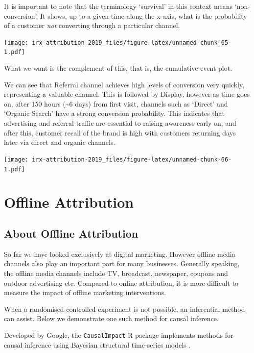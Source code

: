 \documentclass[]{book}
\begin{document}
It is important to note that the terminology `survival' in this context means
`non-conversion'. It shows, up to a given time along the x-axis, what is the probability
of a customer \emph{not} converting through a particular channel.

\texttt{[image: irx-attribution-2019\_files/figure-latex/unnamed-chunk-65-1.pdf]}

What we want is the complement of this, that is, the cumulative event plot.

We can see that Referral channel achieves high levels of conversion very
quickly, representing a valuable channel. This is followed by Display, however
as time goes on, after 150 hours (\textasciitilde{}6 days) from first visit, channels such as
`Direct' and `Organic Search' have a strong conversion probability. This indicates
that advertising and referral traffic are essential to raising awareness early on, and
after this, customer recall of the brand is high with customers returning
days later via direct and organic channels.

\texttt{[image: irx-attribution-2019\_files/figure-latex/unnamed-chunk-66-1.pdf]}

\hypertarget{part-offline-attribution}{%
\part{Offline Attribution}\label{part-offline-attribution}}

\hypertarget{about-offline-attribution}{%
\chapter{About Offline Attribution}\label{about-offline-attribution}}

So far we have looked exclusively at digital marketing. However offline media channels also play an important part for many businesses. Generally speaking, the offline media channels include TV, broadcast, newspaper, coupons and outdoor advertising etc. Compared to online attribution, it is more difficult to measure the impact of offline marketing interventions.

When a randomised controlled experiment is not possible, an inferential method can
assist. Below we demonstrate one such method for causal inference.

Developed by Google, the \texttt{CausalImpact} R package implements methods for
causal inference using Bayesian structural time-series models \citep{causalimpact}.
\end{document}
